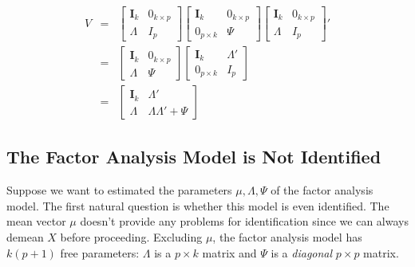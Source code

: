 	\begin{eqnarray*}
		V &=& \left[\begin{array}{cc}
		\mathbf{I}_k & 0_{k\times p} \\ \Lambda & I_{p}
	\end{array}\right]
\left[\begin{array}{cc}
		\mathbf{I}_k & 0_{k\times p} \\ 0_{p\times k} & \Psi
	\end{array}\right]
	\left[\begin{array}{cc}
		\mathbf{I}_k & 0_{k\times p} \\ \Lambda & I_{p}
	\end{array}\right]'\\
	&=& \left[ \begin{array}
		{cc} 
		\mathbf{I}_k & 0_{k\times p}\\
		\Lambda & \Psi
	\end{array}\right]\left[\begin{array}{cc}
		\mathbf{I}_k & \Lambda '\\
		0_{p\times k} & I_{p} 
	\end{array}\right]\\
	&=& \left[\begin{array}
		{cc}
		\mathbf{I}_k & \Lambda' \\
		\Lambda & \Lambda \Lambda' + \Psi
	\end{array}\right]
	\end{eqnarray*}


\subsection{The Factor Analysis Model is Not Identified}
Suppose we want to estimated the parameters $\mu, \Lambda, \Psi$ of the factor analysis model. The first natural question is whether this model is even identified. The mean vector $\mu$ doesn't provide any problems for identification since we can always demean $X$ before proceeding. Excluding $\mu$, the factor analysis model has $k(p + 1)$ free parameters: $\Lambda$ is a $p\times k$ matrix and $\Psi$ is a \emph{diagonal} $p\times p$ matrix.


